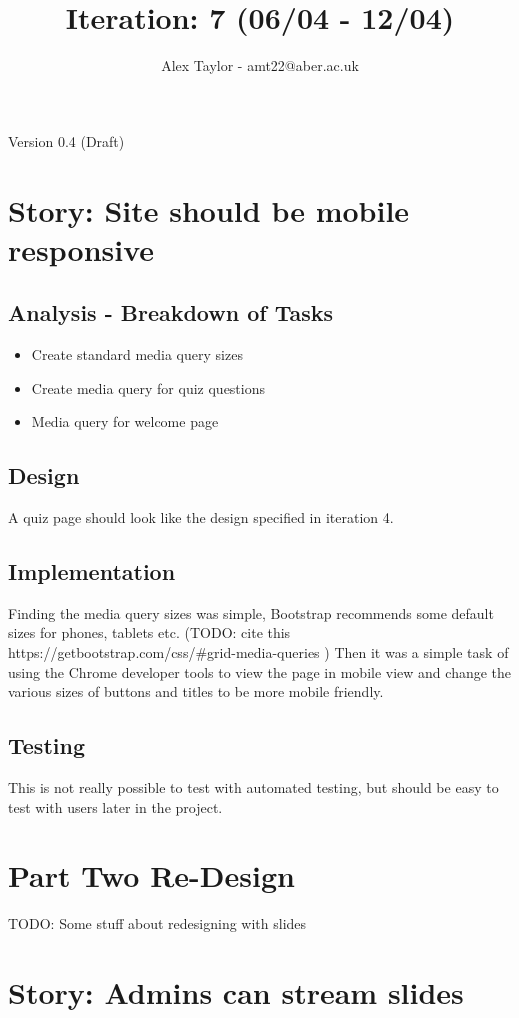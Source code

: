 \documentclass{article}
\title{Iteration: 7 (06/04 - 12/04)}
\author{Alex Taylor - amt22@aber.ac.uk}
\begin{document}
\maketitle
\begin{center}
	Version 0.4 (Draft)
\end{center}
\tableofcontents
\thispagestyle{empty}
\newpage

\section{Story: Site should be mobile responsive}
\subsection{Analysis - Breakdown of Tasks}
\begin{itemize}
	\item Create standard media query sizes
	\item Create media query for quiz questions
	\item Media query for welcome page
\end{itemize}
\subsection{Design}
A quiz page should look like the design specified in iteration 4.
\subsection{Implementation}
Finding the media query sizes was simple, Bootstrap recommends some default sizes for phones, tablets etc. (TODO: cite this https://getbootstrap.com/css/\#grid-media-queries ) Then it was a simple task of using the Chrome developer tools to view the page in mobile view and change the various sizes of buttons and titles to be more mobile friendly.
\subsection{Testing}
This is not really possible to test with automated testing, but should be easy to test with users later in the project.
\newpage

\section{Part Two Re-Design}
TODO: Some stuff about redesigning with slides
\newpage

\section{Story: Admins can stream slides}
\end{document}
